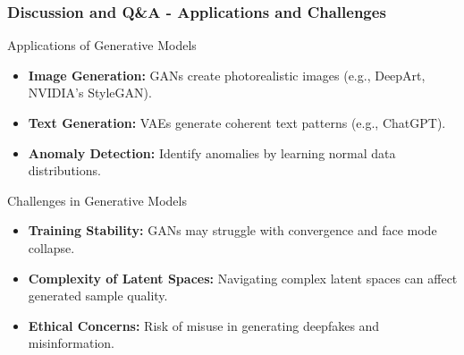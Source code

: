 \documentclass[aspectratio=169]{beamer}
\begin{document}
\begin{frame}[fragile]
    \frametitle{Discussion and Q\&A - Applications and Challenges}
    
    \begin{block}{Applications of Generative Models}
        \begin{itemize}
            \item \textbf{Image Generation:} GANs create photorealistic images (e.g., DeepArt, NVIDIA’s StyleGAN).
            \item \textbf{Text Generation:} VAEs generate coherent text patterns (e.g., ChatGPT).
            \item \textbf{Anomaly Detection:} Identify anomalies by learning normal data distributions.
        \end{itemize}
    \end{block}
    
    \begin{block}{Challenges in Generative Models}
        \begin{itemize}
            \item \textbf{Training Stability:} GANs may struggle with convergence and face mode collapse.
            \item \textbf{Complexity of Latent Spaces:} Navigating complex latent spaces can affect generated sample quality.
            \item \textbf{Ethical Concerns:} Risk of misuse in generating deepfakes and misinformation.
        \end{itemize}
    \end{block}
\end{frame}
\end{document}
